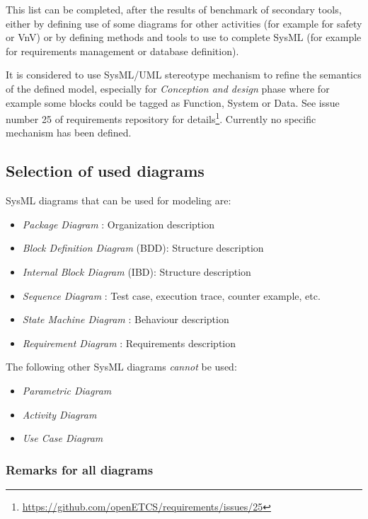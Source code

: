 This list can be completed, after the results of benchmark  of secondary tools, either by defining use of some diagrams for other activities (for example for safety or VnV) or by defining methods and tools to use to complete SysML (for example for requirements management or database definition).

It is considered to use SysML/UML stereotype mechanism to refine the
semantics of the defined model, especially for \emph{Conception and
  design} phase where for example some blocks could be tagged as
Function, System or Data. See issue number 25 of requirements
repository for
details\footnote{\url{https://github.com/openETCS/requirements/issues/25}}.
Currently no specific mechanism has been defined.

\subsection{Selection of used diagrams}

SysML diagrams that can be used for modeling are:
\begin{itemize}
\item \emph{Package Diagram}   : Organization description
\item \emph{Block Definition Diagram}  (BDD): Structure description
\item \emph{Internal Block Diagram}  (IBD): Structure description
\item \emph{Sequence Diagram}  : Test case, execution trace, counter
  example, etc.
\item \emph{State Machine Diagram}  : Behaviour description
\item \emph{Requirement Diagram}  : Requirements description
\end{itemize}

The following other SysML diagrams \emph{cannot} be used:
\begin{itemize}
\item \emph{Parametric Diagram}
\item \emph{Activity Diagram}
\item \emph{Use Case Diagram}
\end{itemize}

\subsubsection{Remarks for all diagrams}

